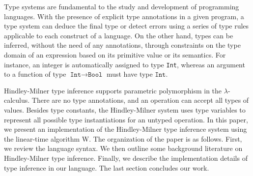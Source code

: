 Type systems are fundamental to the study and development of programming languages. 
With the presence of explicit type annotations in a given program, a type system can deduce 
the final type or detect errors using a series of type rules applicable to each construct 
of a language. On the other hand, types can be inferred, without the need of any annotations, through constraints 
on the type domain of an expression based on its primitive value or its semantics. For instance, 
an integer is automatically assigned to type \texttt{Int}, whereas an argument to a function of type 
$\texttt{Int} \rightarrow \texttt{Bool}$ must have type $\texttt{Int}$.

Hindley-Milner type inference supports parametric polymorphism in the $\lambda$-calculus. There are no type 
annotations, and an operation can accept all types of values. Besides type constants, the Hindley-Milner 
system uses type variables to represent all possible type instantiations for an untyped operation. 
In this paper, we present an implementation of the Hindley-Milner type inference system using the 
linear-time algorithm W. The organization of the paper is as follows. First, we review the language syntax. 
We then outline some background literature on Hindley-Milner type inference. Finally, 
we describe the implementation details of type inference in our language. The last section 
concludes our work.